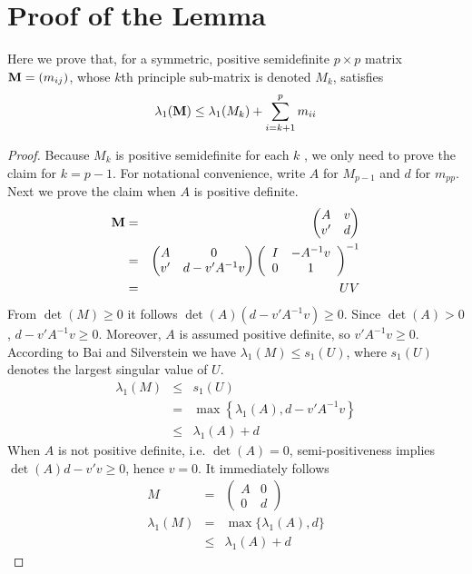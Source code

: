\documentclass{article}
\begin{document}
\section{Proof of the Lemma}
Here we prove that, for a symmetric, positive semidefinite $p \times
p$ matrix $\mathbf{M} = (m_{ij})$, whose $k$th principle sub-matrix is denoted
$M_k$, satisfies
\[
\lambda_1(\mathbf{M}) \leq \lambda_1(M_{k}) + \sum_{i=k+1}^p m_{ii}
\]
\begin{proof}
  Because $M_k$ is positive semidefinite for each $k$ , we only need
  to prove the claim for $k=p-1$. For notational convenience, write
  $A$ for $M_{p-1}$ and $d$ for $m_{pp}$. Next we prove the claim when
  $A$ is positive definite.
  \begin{eqnarray*}
    \mathbf{M} &=&
    \begin{pmatrix}
      A & v \\
      v' & d
    \end{pmatrix} \\
    &=&
    \begin{pmatrix}
      A & 0 \\
      v' & d - v' A^{-1} v
    \end{pmatrix}\left(
      \begin{array}{cc}
        I & -A^{-1} v \\
        0 & 1
      \end{array}\right)^{-1} \\
    &=& U V
  \end{eqnarray*}
  From $\det(M) \geq 0$ it follows $\det(A) (d - v' A^{-1} v) \geq
  0$. Since $\det(A) > 0$, $d - v' A^{-1} v \geq 0$. Moreover, $A$ is
  assumed positive definite, so $v' A^{-1} v \geq 0$. According
  to Bai and Silverstein\cite{BaiSilverstein2010} we have
  $\lambda_1(M) \leq s_1(U)$, where $s_1(U)$ denotes the largest
  singular value of $U$.
  \begin{eqnarray*}
    \lambda_1(M) &\leq& s_1(U) \\
    &=& \max\left\{\lambda_1(A), d - v' A^{-1} v \right\} \\
    &\leq& \lambda_1(A) + d
  \end{eqnarray*}
  When $A$ is not positive definite, i.e. $\det(A)=0$,
  semi-positiveness implies $\det(A) d - v' v \geq 0$, hence $v =
  0$. It immediately follows
  \begin{eqnarray*}
    M &=&
    \begin{pmatrix}
      A & 0 \\
      0 & d
    \end{pmatrix} \\
    \lambda_1(M) &=& \max\{\lambda_1(A), d\} \\
    &\leq& \lambda_1(A) + d
  \end{eqnarray*}
\end{proof}


\end{document}
